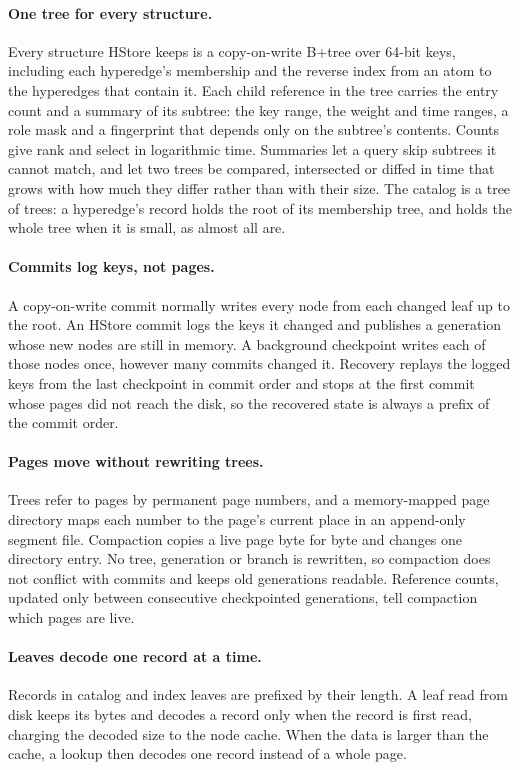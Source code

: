 \paragraph{One tree for every structure.} Every structure HStore keeps is a copy-on-write B+tree over 64-bit keys, including each hyperedge's membership and the reverse index from an atom to the hyperedges that contain it. Each child reference in the tree carries the entry count and a summary of its subtree: the key range, the weight and time ranges, a role mask and a fingerprint that depends only on the subtree's contents. Counts give rank and select in logarithmic time. Summaries let a query skip subtrees it cannot match, and let two trees be compared, intersected or diffed in time that grows with how much they differ rather than with their size. The catalog is a tree of trees: a hyperedge's record holds the root of its membership tree, and holds the whole tree when it is small, as almost all are.

\paragraph{Commits log keys, not pages.} A copy-on-write commit normally writes every node from each changed leaf up to the root. An HStore commit logs the keys it changed and publishes a generation whose new nodes are still in memory. A background checkpoint writes each of those nodes once, however many commits changed it. Recovery replays the logged keys from the last checkpoint in commit order and stops at the first commit whose pages did not reach the disk, so the recovered state is always a prefix of the commit order.

\paragraph{Pages move without rewriting trees.} Trees refer to pages by permanent page numbers, and a memory-mapped page directory maps each number to the page's current place in an append-only segment file. Compaction copies a live page byte for byte and changes one directory entry. No tree, generation or branch is rewritten, so compaction does not conflict with commits and keeps old generations readable. Reference counts, updated only between consecutive checkpointed generations, tell compaction which pages are live.

\paragraph{Leaves decode one record at a time.} Records in catalog and index leaves are prefixed by their length. A leaf read from disk keeps its bytes and decodes a record only when the record is first read, charging the decoded size to the node cache. When the data is larger than the cache, a lookup then decodes one record instead of a whole page.

